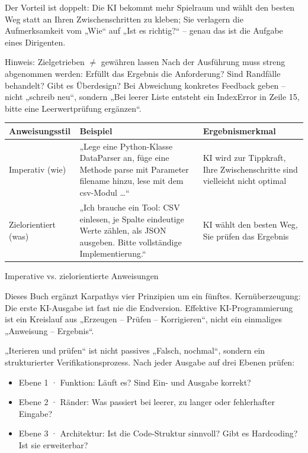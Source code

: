 Der Vorteil ist doppelt: Die KI bekommt mehr Spielraum und wählt den besten Weg statt an Ihren Zwischenschritten zu kleben; Sie verlagern die Aufmerksamkeit vom „Wie“ auf „Ist es richtig?“ – genau das ist die Aufgabe eines Dirigenten.

\begin{tcbwarn}{Hinweis: Zielgetrieben $\neq$ gewähren lassen}
Nach der Ausführung muss streng abgenommen werden: Erfüllt das Ergebnis die Anforderung? Sind Randfälle behandelt? Gibt es Überdesign? Bei Abweichung konkretes Feedback geben – nicht „schreib neu“, sondern „Bei leerer Liste entsteht ein IndexError in Zeile 15, bitte eine Leerwertprüfung ergänzen“.

\end{tcbwarn}

\begin{center}
\begin{tabularx}{\linewidth}{|X|X|X|}
\hline
\textbf{Anweisungsstil} & \textbf{Beispiel} & \textbf{Ergebnismerkmal} \tabularnewline
\hline
Imperativ (wie) & „Lege eine Python-Klasse DataParser an, füge eine Methode parse mit Parameter filename hinzu, lese mit dem csv-Modul …“ & KI wird zur Tippkraft, Ihre Zwischenschritte sind vielleicht nicht optimal \tabularnewline
Zielorientiert (was) & „Ich brauche ein Tool: CSV einlesen, je Spalte eindeutige Werte zählen, als JSON ausgeben. Bitte vollständige Implementierung.“ & KI wählt den besten Weg, Sie prüfen das Ergebnis \tabularnewline
\hline
\end{tabularx}
\end{center}

\begin{center}\small\color{gray}Imperative vs. zielorientierte Anweisungen\end{center}


Dieses Buch ergänzt Karpathys vier Prinzipien um ein fünftes. Kernüberzeugung: Die erste KI-Ausgabe ist fast nie die Endversion. Effektive KI-Programmierung ist ein Kreislauf aus „Erzeugen – Prüfen – Korrigieren“, nicht ein einmaliges „Anweisung – Ergebnis“.

„Iterieren und prüfen“ ist nicht passives „Falsch, nochmal“, sondern ein strukturierter Verifikationsprozess. Nach jeder Ausgabe auf drei Ebenen prüfen:

\begin{itemize}
  \item Ebene 1 · Funktion: Läuft es? Sind Ein- und Ausgabe korrekt?
  \item Ebene 2 · Ränder: Was passiert bei leerer, zu langer oder fehlerhafter Eingabe?
  \item Ebene 3 · Architektur: Ist die Code-Struktur sinnvoll? Gibt es Hardcoding? Ist sie erweiterbar?
\end{itemize}

